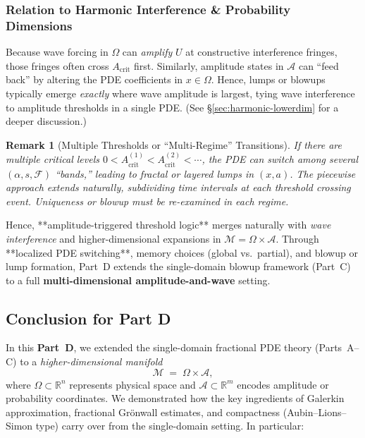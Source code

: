 \documentclass[12pt]{article}
\newtheorem{remark}[theorem]{Remark}
\begin{document}
\subsubsection{Relation to Harmonic Interference \& Probability Dimensions}

Because wave forcing in $\Omega$ can \emph{amplify} $U$ at constructive interference 
fringes, those fringes often cross $A_{\mathrm{crit}}$ first. Similarly, amplitude 
states in $\mathcal{A}$ can “feed back” by altering the PDE coefficients in $x\in\Omega$. 
Hence, lumps or blowups typically emerge \emph{exactly} where wave amplitude is largest, 
tying wave interference to amplitude thresholds in a single PDE. 
(See \S\ref{sec:harmonic-lowerdim} for a deeper discussion.)

\begin{remark}[Multiple Thresholds or “Multi-Regime” Transitions]
If there are multiple critical levels $0<A_{\mathrm{crit}}^{(1)}<A_{\mathrm{crit}}^{(2)}<\cdots$, 
the PDE can switch among several $(\alpha,s,\mathcal{F})$ “bands,” 
leading to fractal or layered lumps in $(x,a)$. 
The piecewise approach extends naturally, subdividing time intervals at each threshold 
crossing event. Uniqueness or blowup must be re-examined in each regime.
\end{remark}

Hence, **amplitude-triggered threshold logic** merges naturally with \emph{wave interference} 
and higher-dimensional expansions in $\mathcal{M}=\Omega\times\mathcal{A}$. Through 
**localized PDE switching**, memory choices (global vs.\ partial), and blowup or lump 
formation, Part~D extends the single-domain blowup framework (Part~C) to a full 
\textbf{multi-dimensional amplitude-and-wave} setting.

\subsection*{Conclusion for Part D}
\label{sec:conclusion_partD}

In this \textbf{Part~D}, we extended the single-domain fractional PDE theory (Parts~A--C) to a 
\emph{higher-dimensional manifold}
\[
\mathcal{M} \;=\; \Omega\times\mathcal{A},
\]
where \(\Omega\subset \mathbb{R}^n\) represents physical space and \(\mathcal{A}\subset \mathbb{R}^m\) 
encodes amplitude or probability coordinates. We demonstrated how the key ingredients of 
Galerkin approximation, fractional Gr\"onwall estimates, and compactness (Aubin--Lions--Simon 
type) carry over from the single-domain setting. In particular:
\end{document}
